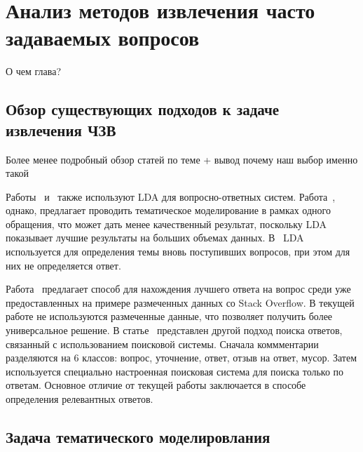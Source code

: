 \chapter{Анализ методов извлечения часто задаваемых вопросов}
\label{chap:overview}

О чем глава?

\section{Обзор существующих подходов к задаче извлечения ЧЗВ}
\label{sec:researches}

Более менее подробный обзор статей по теме + вывод почему наш выбор именно такой

Работы~\cite{LDA1} и~\cite{LDA2} также используют LDA для вопросно-ответных систем. Работа~\cite{LDA1}, однако, предлагает проводить тематическое моделирование в рамках одного обращения, что может дать менее качественный результат, поскольку LDA показывает лучшие результаты на больших объемах данных. В~\cite{LDA2} LDA используется для определения темы вновь поступивших вопросов, при этом для них не определяется ответ.

Работа~\cite{so} предлагает способ для нахождения лучшего ответа  на вопрос среди уже предоставленных на примере размеченных данных со Stack Overflow. В текущей работе не используются размеченные данные, что позволяет получить более универсальное решение. В статье~\cite{engine} представлен другой подход поиска ответов, связанный с использованием поисковой системы. Сначала коммментарии разделяются на 6 классов: вопрос, уточнение, ответ, отзыв на ответ, мусор. Затем используется специально настроенная поисковая система для поиска только по ответам. Основное отличие от текущей работы заключается в способе определения релевантных ответов.

\section{Задача тематического моделировлания}
\label{sec:overview_tm}

